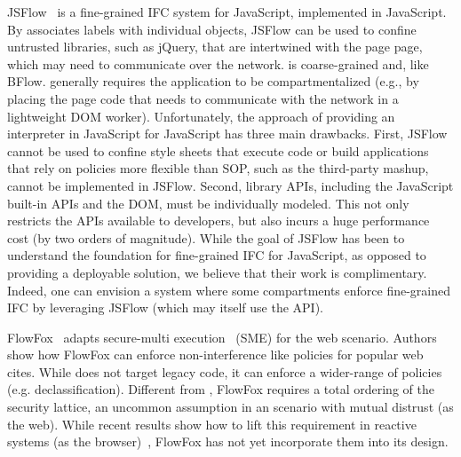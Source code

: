 JSFlow~\cite{JSFlow} is a fine-grained IFC system for JavaScript,
implemented in JavaScript.
%
By associates labels with individual objects, JSFlow can be used to
confine untrusted libraries, such as jQuery, that are intertwined with
the page page, which may need to communicate over the network.
%
\sys{} is coarse-grained and, like BFlow. generally requires the
application to be compartmentalized (e.g., by placing the page code
that needs to communicate with the network in a lightweight DOM
worker).
%
Unfortunately, the approach of providing an interpreter in JavaScript
for JavaScript has three main drawbacks.
%
First, JSFlow cannot be used to confine style sheets that execute code
or build applications that rely on policies more flexible than SOP,
such as the third-party mashup, cannot be implemented in JSFlow.
%
%
Second, library APIs, including the JavaScript built-in APIs and the
DOM, must be individually modeled.
%
This not only restricts the APIs available to developers, but also
incurs a huge performance cost (by two orders of magnitude).
%
While the goal of JSFlow has been to understand the foundation for
fine-grained IFC for JavaScript, as opposed to providing a deployable
solution, we believe that their work is complimentary.
%
Indeed, one can envision a system where some \sys{} compartments
enforce fine-grained IFC by leveraging JSFlow (which may itself use
the \sys{} API).





FlowFox~\cite{DeGroef:2012} adapts secure-multi execution~\cite{Devriese:2010}
(SME) for the web scenario. Authors show how FlowFox can enforce
non-interference like policies for popular web cites. While \sys{} does not
target legacy code, it can enforce a wider-range of policies
(e.g. declassification). Different from \sys{}, FlowFox requires a total
ordering of the security lattice, an uncommon assumption in an scenario with
mutual distrust (as the web). While recent results show how to lift this
requirement in reactive systems (as the browser)~\cite{ZanariniJR13}, FlowFox
has not yet incorporate them into its design.

